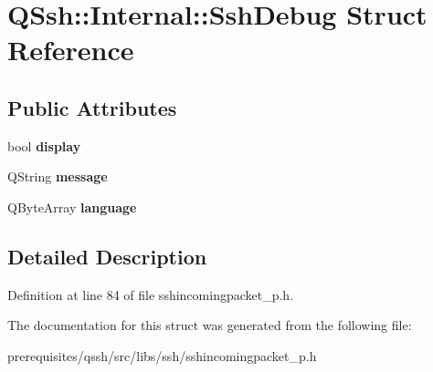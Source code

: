 \hypertarget{struct_q_ssh_1_1_internal_1_1_ssh_debug}{}\section{Q\+Ssh\+:\+:Internal\+:\+:Ssh\+Debug Struct Reference}
\label{struct_q_ssh_1_1_internal_1_1_ssh_debug}
\subsection*{Public Attributes}
\begin{DoxyCompactItemize}
\item 
\mbox{\label{struct_q_ssh_1_1_internal_1_1_ssh_debug_a43b9204ccb0a27991b3492e6222000cf}} 
bool {\bfseries display}
\item 
\mbox{\label{struct_q_ssh_1_1_internal_1_1_ssh_debug_a77023c1a04882865f7bfae5cf98dd094}} 
Q\+String {\bfseries message}
\item 
\mbox{\label{struct_q_ssh_1_1_internal_1_1_ssh_debug_aa10ccd5c76b0c315c52d0e9955273d88}} 
Q\+Byte\+Array {\bfseries language}
\end{DoxyCompactItemize}


\subsection{Detailed Description}


Definition at line 84 of file sshincomingpacket\+\_\+p.\+h.



The documentation for this struct was generated from the following file\+:\begin{DoxyCompactItemize}
\item 
prerequisites/qssh/src/libs/ssh/sshincomingpacket\+\_\+p.\+h\end{DoxyCompactItemize}
